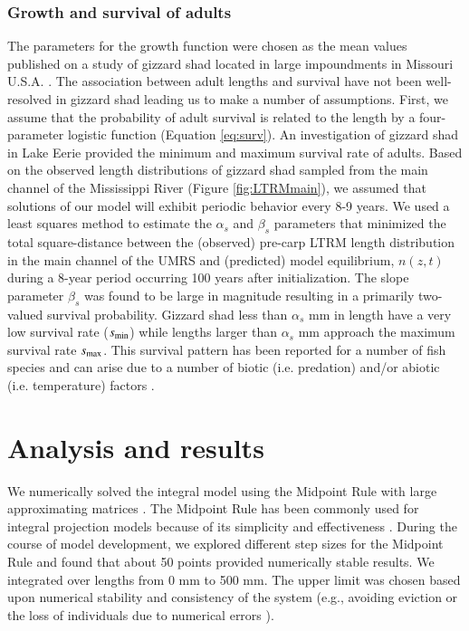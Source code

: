 \documentclass[preprint,review,12pt,authoryear]{elsarticle}
\def\ds{\displaystyle}
\begin{document}
\subsubsection{Growth and survival of adults}
The parameters for the growth function were chosen as the mean values published on a study of gizzard shad located in large impoundments in Missouri U.S.A. \citep{michaletz2017variation}. 
The association between adult lengths and survival have not been well-resolved in gizzard shad leading us to make a number of assumptions.  
First, we assume that the probability of adult survival is related to the length by a four-parameter logistic function (Equation \ref{eq:surv}).
An investigation of gizzard shad in Lake Eerie \citep{bodola1955life} provided the minimum and maximum survival rate of adults. 
Based on the observed length distributions of gizzard shad sampled from the main channel of the Mississippi River (Figure \ref{fig:LTRMmain}), we assumed that solutions of our model will exhibit periodic behavior every 8-9 years.   
We used a least squares method to estimate the $\alpha_s$ and $\beta_s$ parameters that 
minimized the total square-distance between the (observed) pre-carp LTRM length distribution in the main channel of the UMRS and (predicted) model equilibrium, $n(z,t)$ during a 8-year period occurring 100 years after initialization.  
The slope parameter $\beta_s$ was found to be large in magnitude resulting in a primarily two-valued survival probability.  
Gizzard shad less than $\alpha_s$ mm in length have a very low survival rate ($\ds s_{\rm {min}}$) while lengths larger than  $\alpha_s$ mm approach the maximum survival rate $\ds s_{\rm {max}}$. 
This survival pattern has been reported for a number of fish species and can arise due to a number of biotic (i.e. predation) and/or abiotic (i.e. temperature) factors \citep{pepin1992significance, nowlin2006gape}. 
\section{Analysis and results}
We numerically solved the integral model using the Midpoint Rule with large approximating matrices \citep{burden2005numerical}. 
The Midpoint Rule has been commonly used for integral projection models because of its simplicity and effectiveness \citep{ellner2006integral, ramula2009integral,  merow2014advancing}. 
During the course of model development, we explored different step sizes for the Midpoint Rule and found that about 50 points provided numerically stable results. 
We integrated over lengths from 0 mm to 500 mm. 
The upper limit was chosen based upon numerical stability and consistency of the system (e.g., avoiding eviction or the loss of individuals due to numerical errors \citep{williams2012avoiding}). 
\end{document}
